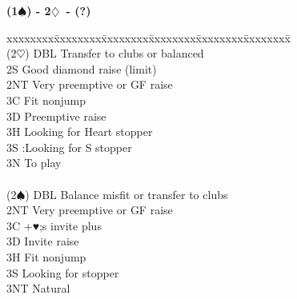 \documentclass[10pt]{article}
\renewcommand{\d}{$\diamondsuit$}
\newcommand{\h}{$\heartsuit$}
\newcommand{\s}{$\spadesuit$}
\newenvironment{bidtable}[1][]
{\textbf{#1}
  \begin{adjustwidth}{1em}{}
    \addvspace{2pt}
    \begin{tabbing}
      xxxxxxxx\=xxxxxxxx\=xxxxxxxx\=xxxxxxxx\=xxxxxxxx\=xxxxxxxx\=\kill}
{\end{tabbing}\end{adjustwidth}\bigskip}%
\begin{document}
\begin{multicols*}{2}
\begin{bidtable}[(1\s) - 2\d\ - (?)]
                                                                                                       \\
(2\h)  \> DBL  \> Transfer to clubs or balanced                                                        \\
       \> 2S   \> Good diamond raise (limit)                                                           \\
       \> 2NT  \> Very preemptive or GF raise                                                          \\
       \> 3C   \> Fit nonjump                                                                          \\
       \> 3D   \> Preemptive raise                                                                     \\
       \> 3H   \> Looking for Heart stopper                                                            \\
       \> 3S   \> :Looking for S stopper                                                               \\
       \> 3N   \> To play                                                                              \\
                                                                                                       \\
(2\s)  \> DBL  \> Balance misfit or transfer to clubs                                                  \\
       \> 2NT  \> Very preemptive or GF raise                                                          \\
       \> 3C   +♥;s invite plus                                                                    \\
       \> 3D   \> Invite raise                                                                         \\
       \> 3H   \> Fit nonjump                                                                          \\
       \> 3S   \> Looking for stopper                                                                  \\
       \> 3NT  \> Natural
\end{bidtable}


\end{multicols*}
\end{document}
